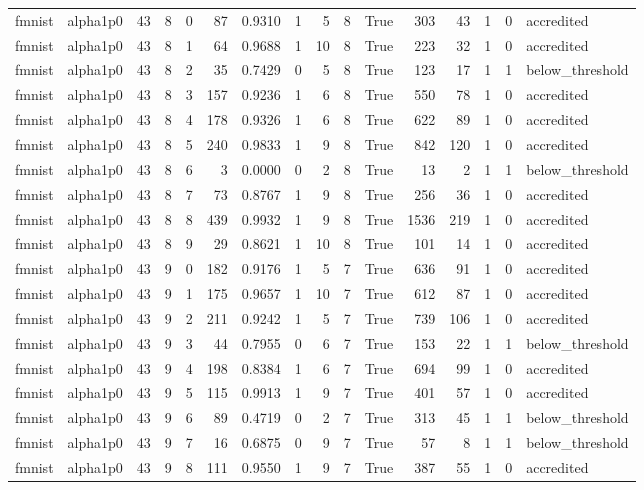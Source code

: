 \begin{tabular}{llrrrrrrrrrrrrrl}
fmnist & alpha1p0 & 43 & 8 & 0 & 87 & 0.9310 & 1 & 5 & 8 & True & 303 & 43 & 1 & 0 & accredited \\
fmnist & alpha1p0 & 43 & 8 & 1 & 64 & 0.9688 & 1 & 10 & 8 & True & 223 & 32 & 1 & 0 & accredited \\
fmnist & alpha1p0 & 43 & 8 & 2 & 35 & 0.7429 & 0 & 5 & 8 & True & 123 & 17 & 1 & 1 & below\_threshold \\
fmnist & alpha1p0 & 43 & 8 & 3 & 157 & 0.9236 & 1 & 6 & 8 & True & 550 & 78 & 1 & 0 & accredited \\
fmnist & alpha1p0 & 43 & 8 & 4 & 178 & 0.9326 & 1 & 6 & 8 & True & 622 & 89 & 1 & 0 & accredited \\
fmnist & alpha1p0 & 43 & 8 & 5 & 240 & 0.9833 & 1 & 9 & 8 & True & 842 & 120 & 1 & 0 & accredited \\
fmnist & alpha1p0 & 43 & 8 & 6 & 3 & 0.0000 & 0 & 2 & 8 & True & 13 & 2 & 1 & 1 & below\_threshold \\
fmnist & alpha1p0 & 43 & 8 & 7 & 73 & 0.8767 & 1 & 9 & 8 & True & 256 & 36 & 1 & 0 & accredited \\
fmnist & alpha1p0 & 43 & 8 & 8 & 439 & 0.9932 & 1 & 9 & 8 & True & 1536 & 219 & 1 & 0 & accredited \\
fmnist & alpha1p0 & 43 & 8 & 9 & 29 & 0.8621 & 1 & 10 & 8 & True & 101 & 14 & 1 & 0 & accredited \\
fmnist & alpha1p0 & 43 & 9 & 0 & 182 & 0.9176 & 1 & 5 & 7 & True & 636 & 91 & 1 & 0 & accredited \\
fmnist & alpha1p0 & 43 & 9 & 1 & 175 & 0.9657 & 1 & 10 & 7 & True & 612 & 87 & 1 & 0 & accredited \\
fmnist & alpha1p0 & 43 & 9 & 2 & 211 & 0.9242 & 1 & 5 & 7 & True & 739 & 106 & 1 & 0 & accredited \\
fmnist & alpha1p0 & 43 & 9 & 3 & 44 & 0.7955 & 0 & 6 & 7 & True & 153 & 22 & 1 & 1 & below\_threshold \\
fmnist & alpha1p0 & 43 & 9 & 4 & 198 & 0.8384 & 1 & 6 & 7 & True & 694 & 99 & 1 & 0 & accredited \\
fmnist & alpha1p0 & 43 & 9 & 5 & 115 & 0.9913 & 1 & 9 & 7 & True & 401 & 57 & 1 & 0 & accredited \\
fmnist & alpha1p0 & 43 & 9 & 6 & 89 & 0.4719 & 0 & 2 & 7 & True & 313 & 45 & 1 & 1 & below\_threshold \\
fmnist & alpha1p0 & 43 & 9 & 7 & 16 & 0.6875 & 0 & 9 & 7 & True & 57 & 8 & 1 & 1 & below\_threshold \\
fmnist & alpha1p0 & 43 & 9 & 8 & 111 & 0.9550 & 1 & 9 & 7 & True & 387 & 55 & 1 & 0 & accredited \\

\end{tabular}

